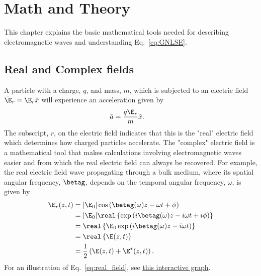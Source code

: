 \chapter{Math and Theory}
\label{ch:MathAndTheory}

This chapter explains the basic mathematical tools needed for describing electromagnetic waves and understanding Eq.~\ref{eq:GNLSE}.


\section{Real and Complex fields}
A particle with a charge, $q$, and mass, $m$, which is subjected to an electric field $\Bar{\E}_r =\E_r \hat{x}$ will experience an acceleration given by
\begin{align}
    \Bar{a} &=  \frac{q\E_r}{m}\hat{x}.
\end{align}
The subscript, $r$, on the electric field indicates that this is the "real" electric field which determines how charged particles accelerate. The "complex" electric field is a mathematical tool that makes calculations involving electromagnetic waves easier and from which the real electric field can always be recovered. For example, the real electric field wave propagating through a bulk medium, where its spatial angular frequency, $\betag$, depends on the temporal angular frequency, $\omega$, is given by  
\begin{align}
\label{eq:real_field}
    \E_r(z,t) &= |\E_0|\cos\left(\betag(\omega)z-\omega t+\phi\right) \\\nonumber 
     &=|\E_0| \real\left\{  \exp\left( i\betag(\omega)z-i\omega t+i\phi \right) \right\} \\ \nonumber 
     &= \real\left\{ \E_0 \exp\left( i\betag(\omega)z-i\omega t\right) \right\}  \\ \nonumber
     &= \real\left\{ \E(z,t) \right\}  \\ \nonumber
     &=  \frac{1}{2}\left( \E(z,t) + \E^*(z,t) \right).   
\end{align}
For an illustration of Eq.~\ref{eq:real_field}, see \href{https://www.desmos.com/calculator/fgvozursrl}{this interactive graph}. 

